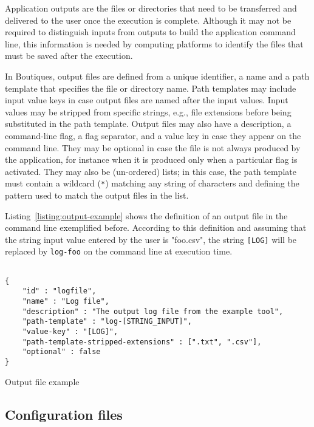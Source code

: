 \documentclass{article}
\begin{document}
Application outputs are the files or directories that need to be
transferred and delivered to the user once the execution is
complete. Although it may not be required to distinguish inputs from
outputs to build the application command line, this information is
needed by computing platforms to identify the files that must be
saved after the execution.

In Boutiques, output files are defined from a unique identifier, a
name and a path template that specifies the file or directory
name. Path templates may include input value keys in case
output files are named after the input values. Input values may be
stripped from specific strings, e.g., file extensions before being
substituted in the path template. Output files may also have a
description, a command-line flag, a flag separator, and a value
key in case they appear on the command line. They may be optional in
case the file is not always produced by the application, for instance
when it is produced only when a particular flag is activated. They
may also be (un-ordered) lists; in this case, the path template must
contain a wildcard (\texttt{*}) matching any string of characters
and defining the pattern used to match the
output files in the list.

Listing~\ref{listing:output-example} shows the definition of an output
file in the command line exemplified before. According to this
definition and assuming that the string input value entered by the
user is "foo.csv", the string \texttt{[LOG]} will be
replaced by \texttt{log-foo} on the command line at execution time.

\begin{listing}
\begin{verbatim}

{
    "id" : "logfile",
    "name" : "Log file",
    "description" : "The output log file from the example tool",
    "path-template" : "log-[STRING_INPUT]",
    "value-key" : "[LOG]",
    "path-template-stripped-extensions" : [".txt", ".csv"],
    "optional" : false
}
\end{verbatim}
\caption{Output file example} 
\label{listing:output-example}
\end{listing}

\subsection{Configuration files}
\end{document}
